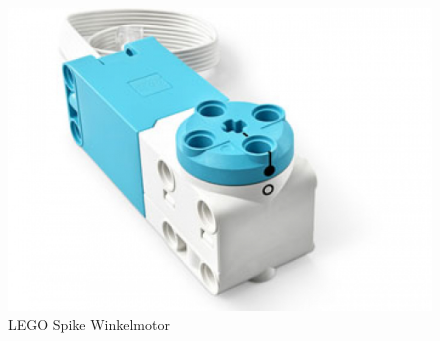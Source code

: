 \begin{figure}[H]
	\centering
	\includegraphics[width=0.4\linewidth]{images/Motor}
	\caption[LEGO Spike Winkelmotor Quelle:\autocite{legoeducation2020spikesensors}]{LEGO Spike Winkelmotor}
	\label{fig:motor}
\end{figure}
